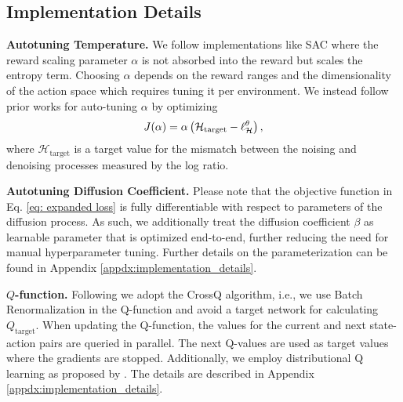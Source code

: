 \subsection{Implementation Details}\label{sec:implementation details}
\textbf{Autotuning Temperature.} We follow implementations like SAC \cite{haarnoja2018softimplementations} where the reward scaling parameter $\alpha$ is not absorbed into the reward but scales the entropy term. 
Choosing $\alpha$ depends on the reward ranges and the dimensionality of the action space which requires tuning it per environment. We instead follow prior works \cite{haarnoja2018softimplementations} for auto-tuning $\alpha$ by optimizing 
\begin{equation}\label{eq:auto_tuning_alpha}
    J(\alpha) = \alpha \left( \mathcal{H}_{\text{target}} - \ell^{\theta}_{\mathcal{H}} \right),
\end{equation}
where $\mathcal{H}_{\text{target}}$ is a target value for the mismatch between the noising and denoising processes measured by the log ratio. 

\textbf{Autotuning Diffusion Coefficient.} Please note that the objective function in Eq. \ref{eq: expanded loss} is fully differentiable with respect to parameters of the diffusion process. As such, we additionally treat the diffusion coefficient $\beta$ as learnable parameter that is optimized end-to-end, further reducing the need for manual hyperparameter tuning. Further details on the parameterization can be found in Appendix \ref{appdx:implementation_details}.
%

\textbf{$Q$-function.} Following \citet{bhattcrossq} we adopt the CrossQ algorithm, i.e., we use Batch Renormalization in the Q-function and avoid a target network for calculating $Q_{\text{target}}$. When updating the Q-function, the values for the current and next state-action pairs are queried in parallel. The next Q-values are used as target values where the gradients are stopped. Additionally, we employ distributional Q learning as proposed by \cite{bellemare2017distributional}. The details are described in Appendix \ref{appdx:implementation_details}.
